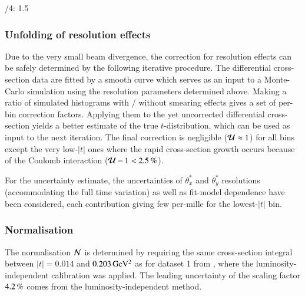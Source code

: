 /4: 1.5%

\fi



\subsubsection{Unfolding of resolution effects}

Due to the very small beam divergence, the correction for resolution effects can be safely determined by the following iterative procedure. The differential cross-section data are fitted by a smooth curve which serves as an input to a Monte-Carlo simulation using the resolution parameters determined above. Making a ratio of simulated histograms with / without smearing effects gives a set of per-bin correction factors. Applying them to the yet uncorrected differential cross-section yields a better estimate of the true $t$-distribution, which can be used as input to the next iteration. The final correction is negligible (${\cal U} \approx 1$) for all bins except the very low-$|t|$ ones where the rapid cross-section growth occurs because of the Coulomb interaction ($ {\cal U} - 1 < 2.5\un{\%}$).

For the uncertainty estimate, the uncertainties of $\theta_x^*$ and $\theta_y^*$ resolutions (accommodating the full time variation) as well as fit-model dependence have been considered, each contribution giving few per-mille for the lowest-$|t|$ bin.

\subsubsection{Normalisation}

The normalisation ${\cal N}$ is determined by requiring the same cross-section integral between $|t| = 0.014$ and $0.203\,{\rm GeV^2}$ as for dataset 1 from \cite{prl111}, where the luminosity-independent calibration was applied. The leading uncertainty of the scaling factor $4.2\,{\rm \%}$ comes from the luminosity-independent method.


